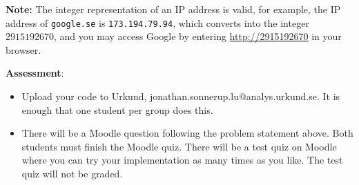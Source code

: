 \documentclass{article}
\begin{document}
\begin{description}
{		\textbf{Note:} The integer representation of an IP address is valid, for example, the IP address of \texttt{google.se}
		is \texttt{173.194.79.94}, which converts into the integer $2915192670$, and you may access Google by entering
		\url{http://2915192670} in your browser.

		\textbf{Assessment}:
	\begin{itemize}
		\item Upload your code to Urkund, jonathan.sonnerup.lu@analys.urkund.se. It is enough that one student per group does this.
		\item There will be a Moodle question following the problem statement above. Both students must finish the Moodle quiz. There will be
			a test quiz on Moodle where you can try your implementation as many times as you like. The test quiz will not be graded.
	\end{itemize}
	}

\end{description}
\end{document}
